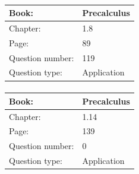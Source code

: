 \documentclass{article}
\begin{document}
            \paragraph{}
            \begin{tabularx}{1\textwidth}{
                    p{}
                    p{}
                }
                \toprule
                Book: & Precalculus
                \\
                \midrule
                Chapter: & 1.8
                \\
                \midrule
                Page: & 89
                \\
                \midrule
                Question number: & 119
                \\
                \midrule
                Question type: & Application
                \\
                \bottomrule
            \end{tabularx}
            
            \paragraph{}
            \begin{tabularx}{1\textwidth}{
                    p{}
                    p{}
                }
                \toprule
                Book: & Precalculus
                \\
                \midrule
                Chapter: & 1.14
                \\
                \midrule
                Page: & 139
                \\
                \midrule
                Question number: & 0
                \\
                \midrule
                Question type: & Application
                \\
                \bottomrule
            \end{tabularx}
            
\end{document}
